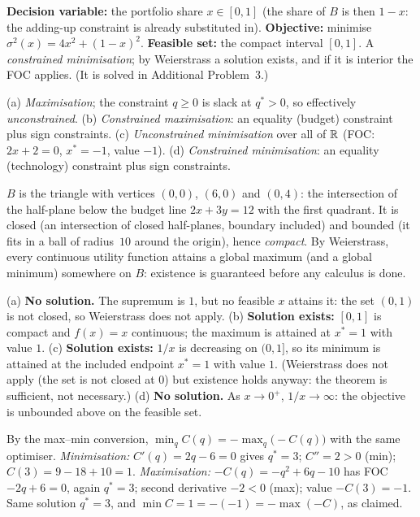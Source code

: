 \begin{solutions}
  \item \textbf{Decision variable:} the portfolio share $x\in[0,1]$
        (the share of $B$ is then $1-x$: the adding-up constraint is
        already substituted in).
        \textbf{Objective:} minimise
        $\sigma^{2}(x)=4x^{2}+(1-x)^{2}$.
        \textbf{Feasible set:} the compact interval $[0,1]$.
        A \emph{constrained minimisation}; by Weierstrass a solution
        exists, and if it is interior the FOC applies. (It is solved in
        Additional Problem~3.)

  \item (a) \emph{Maximisation}; the constraint $q\ge 0$ is slack at
        $q^{*}>0$, so effectively \emph{unconstrained}.
        (b) \emph{Constrained maximisation}: an equality (budget)
        constraint plus sign constraints.
        (c) \emph{Unconstrained minimisation} over all of $\mathbb{R}$ (FOC:
        $2x+2=0$, $x^{*}=-1$, value $-1$).
        (d) \emph{Constrained minimisation}: an equality (technology)
        constraint plus sign constraints.

  \item $B$ is the triangle with vertices $(0,0)$, $(6,0)$ and
        $(0,4)$: the intersection of the half-plane below the budget
        line $2x+3y=12$ with the first quadrant. It is closed (an
        intersection of closed half-planes, boundary included) and
        bounded (it fits in a ball of radius~$10$ around the origin),
        hence \emph{compact}. By Weierstrass, every continuous utility
        function attains a global maximum (and a global minimum)
        somewhere on $B$: existence is guaranteed before any
        calculus is done.

  \item (a) \textbf{No solution.} The supremum is $1$, but no feasible
        $x$ attains it: the set $(0,1)$ is not closed, so Weierstrass
        does not apply.
        (b) \textbf{Solution exists:} $[0,1]$ is compact and $f(x)=x$
        continuous; the maximum is attained at $x^{*}=1$ with value
        $1$.
        (c) \textbf{Solution exists:} $1/x$ is decreasing on $(0,1]$,
        so its minimum is attained at the included endpoint $x^{*}=1$
        with value $1$. (Weierstrass does not apply (the set is not
        closed at $0$) but existence holds anyway: the theorem is
        sufficient, not necessary.)
        (d) \textbf{No solution.} As $x\to 0^{+}$, $1/x\to\infty$: the
        objective is unbounded above on the feasible set.

  \item By the max--min conversion,
        $\min_{q} C(q) = -\max_{q}\bigl(-C(q)\bigr)$ with the same
        optimiser. \emph{Minimisation:} $C'(q)=2q-6=0$ gives $q^{*}=3$;
        $C''=2>0$ (min); $C(3)=9-18+10=1$.
        \emph{Maximisation:} $-C(q)=-q^{2}+6q-10$ has FOC
        $-2q+6=0$, again $q^{*}=3$; second derivative $-2<0$ (max);
        value $-C(3)=-1$. Same solution $q^{*}=3$, and
        $\min C = 1 = -(-1) = -\max(-C)$, as claimed.


\end{solutions}
